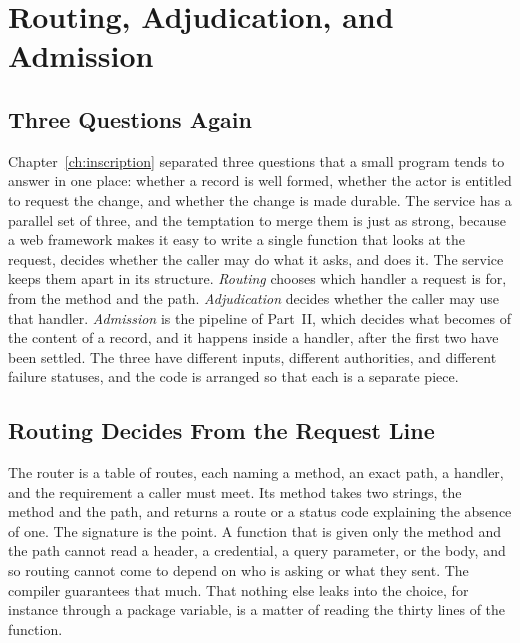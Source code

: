 \chapter{Routing, Adjudication, and Admission}
\label{ch:adjudication}

\section{Three Questions Again}

Chapter~\ref{ch:inscription} separated three questions that a small program tends to answer in one place: whether a record is well formed, whether the actor is entitled to request the change, and whether the change is made durable. The service has a parallel set of three, and the temptation to merge them is just as strong, because a web framework makes it easy to write a single function that looks at the request, decides whether the caller may do what it asks, and does it. The service keeps them apart in its structure. \emph{Routing} chooses which handler a request is for, from the method and the path. \emph{Adjudication} decides whether the caller may use that handler. \emph{Admission} is the pipeline of Part~II, which decides what becomes of the content of a record, and it happens inside a handler, after the first two have been settled. The three have different inputs, different authorities, and different failure statuses, and the code is arranged so that each is a separate piece.

\section{Routing Decides From the Request Line}


The router is a table of routes, each naming a method, an exact path, a handler, and the requirement a caller must meet. Its method  takes two strings, the method and the path, and returns a route or a status code explaining the absence of one. The signature is the point. A function that is given only the method and the path cannot read a header, a credential, a query parameter, or the body, and so routing cannot come to depend on who is asking or what they sent. The compiler guarantees that much. That nothing else leaks into the choice, for instance through a package variable, is a matter of reading the thirty lines of the function.

